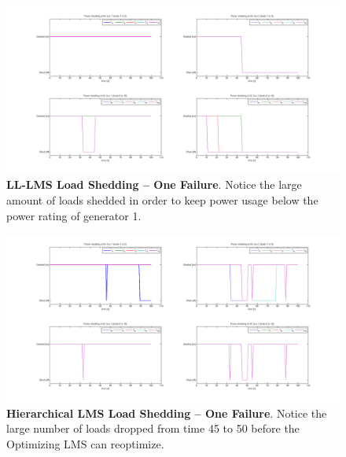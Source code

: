\documentclass{acm_proc_article-sp}
\begin{document}
\begin{figure}[ht]
  \centering
  \includegraphics[width=0.9\columnwidth]{figures/lsllonefail.png}
  \caption{\textbf{LL-LMS Load Shedding -- One Failure}. Notice
  the large amount of loads shedded in order to keep power usage below the power rating
  of generator 1.}
  \label{fig:lsllonefail}
\end{figure}
\begin{figure}[ht]
  \centering
  \includegraphics[width=0.9\columnwidth]{figures/lsolonefail.png}
  \caption{\textbf{Hierarchical LMS Load Shedding -- One Failure}. Notice the
  large number of loads dropped from time 45 to 50 before the Optimizing LMS can reoptimize.}
  \label{fig:lsolonefail}
\end{figure}
\end{document}
